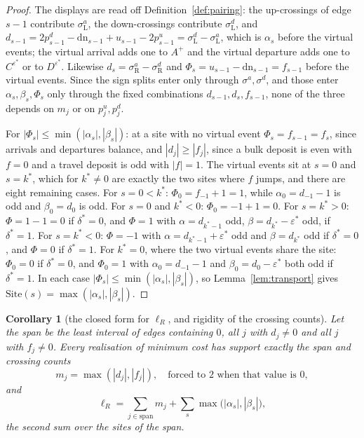 \documentclass[11pt]{article}
\theoremstyle{plain}
\newtheorem{corollary}[theorem]{Corollary}
\theoremstyle{definition}
\theoremstyle{remark}
\begin{document}
\begin{proof}
The displays are read off Definition~\ref{def:pairing}: the up-crossings of edge $s-1$ contribute
$\sigma^a_{\mathrm L}$, the down-crossings contribute $\sigma^d_{\mathrm L}$, and
$d_{s-1}=2p^d_{s-1}-\mathrm{dn}_{s-1}+u_{s-1}-2p^u_{s-1}=\sigma^d_{\mathrm L}-\sigma^a_{\mathrm L}$,
which is $\alpha_s$ before the virtual events; the virtual arrival adds one to $A^+$ and the virtual
departure adds one to $C^{\varepsilon^\ast}$ or to $D^{\varepsilon^\ast}$. Likewise
$d_s=\sigma^a_{\mathrm R}-\sigma^d_{\mathrm R}$ and
$\Phi_s=u_{s-1}-\mathrm{dn}_{s-1}=f_{s-1}$ before the virtual events. Since the sign splits enter
only through $\sigma^a,\sigma^d$, and those enter $\alpha_s,\beta_s,\Phi_s$ only through the fixed
combinations $d_{s-1},d_s,f_{s-1}$, none of the three depends on $m_j$ or on $p^u_j,p^d_j$.

For $|\Phi_s|\le\min(|\alpha_s|,|\beta_s|)$: at a site with no virtual event $\Phi_s=f_{s-1}=f_s$,
since arrivals and departures balance, and $|d_j|\ge|f_j|$, since a bulk deposit is even with $f=0$
and a travel deposit is odd with $|f|=1$. The virtual events sit at $s=0$ and $s=k^\ast$, which for
$k^\ast\ne0$ are exactly the two sites where $f$ jumps, and there are eight remaining cases. For $s=0<k^\ast$: $\Phi_0=f_{-1}+1=1$, while $\alpha_0=d_{-1}-1$ is odd
and $\beta_0=d_0$ is odd. For $s=0$ and $k^\ast<0$: $\Phi_0=-1+1=0$. For $s=k^\ast>0$: $\Phi=1-1=0$
if $\delta^\ast=0$, and $\Phi=1$ with $\alpha=d_{k^\ast-1}$ odd, $\beta=d_{k^\ast}-\varepsilon^\ast$
odd, if $\delta^\ast=1$. For $s=k^\ast<0$: $\Phi=-1$ with $\alpha=d_{k^\ast-1}+\varepsilon^\ast$ odd
and $\beta=d_{k^\ast}$ odd if $\delta^\ast=0$, and $\Phi=0$ if $\delta^\ast=1$. For $k^\ast=0$,
where the two virtual events share the site: $\Phi_0=0$ if $\delta^\ast=0$, and $\Phi_0=1$ with
$\alpha_0=d_{-1}-1$ and $\beta_0=d_0-\varepsilon^\ast$ both odd if $\delta^\ast=1$. In each case
$|\Phi_s|\le\min(|\alpha_s|,|\beta_s|)$, so Lemma~\ref{lem:transport} gives
$\mathrm{Site}(s)=\max(|\alpha_s|,|\beta_s|)$.
\end{proof}

\begin{corollary}[the closed form for $\ell_R$, and rigidity of the crossing counts]\label{cor:lRclosed}
Let the \emph{span} be the least interval of edges containing $0$, all $j$ with $d_j\ne0$ and all
$j$ with $f_j\ne0$. Every realisation of minimum cost has support exactly the span and crossing
counts
\[
   m_j=\max(|d_j|,|f_j|), \quad\text{forced to } 2 \text{ when that value is }0,
\]
and
\[
   \ell_R=\sum_{j\in\mathrm{span}}m_j+\sum_{s}\max\bigl(|\alpha_s|,|\beta_s|\bigr),
\]
the second sum over the sites of the span.
\end{corollary}
\end{document}
